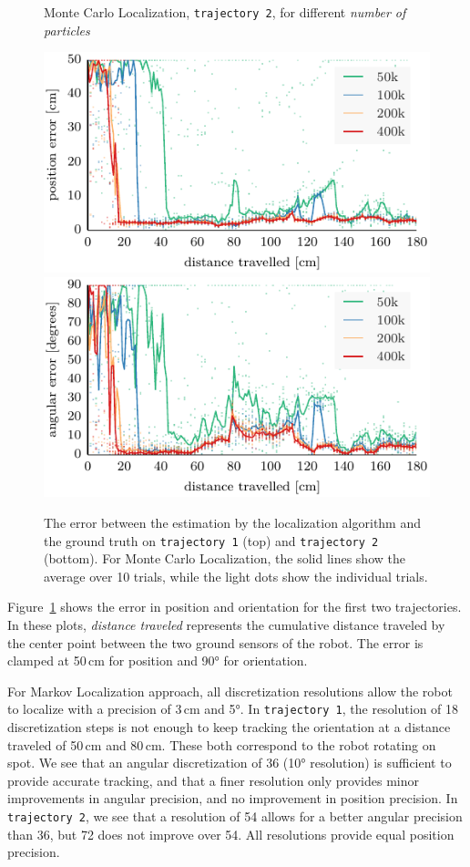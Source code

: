 \documentclass[letterpaper, 10pt, conference]{ieeeconf}
\newcommand{\Fig}[1]{Figure~\ref{fig:#1}}
\begin{document}
\begin{figure}
\begin{center}
Monte Carlo Localization, \texttt{trajectory~2}, for different \emph{number of particles}
\end{center}
\includegraphics{mcl-whole_random_2-xy}\hfill
\includegraphics{mcl-whole_random_2-theta}

\caption{The error between the estimation by the localization algorithm and the ground truth on \texttt{trajectory~1} (top) and \texttt{trajectory~2} (bottom).
For Monte Carlo Localization, the solid lines show the average over 10 trials, while the light dots show the individual trials.}
\label{fig:whole-runs-random12}
\end{figure}

\Fig{whole-runs-random12} shows the error in position and orientation for the first two trajectories.
In these plots, \emph{distance traveled} represents the cumulative distance traveled by the center point between the two ground sensors of the robot.
The error is clamped at 50\,cm for position and 90° for orientation.

For Markov Localization approach, all discretization resolutions allow the robot to localize with a precision of 3\,cm and 5°.
In \texttt{trajectory~1}, the resolution of 18 discretization steps is not enough to keep tracking the orientation at a distance traveled of 50\,cm and 80\,cm.
These both correspond to the robot rotating on spot.
We see that an angular discretization of 36 (10° resolution) is sufficient to provide accurate tracking, and that a finer resolution only provides minor improvements in angular precision, and no improvement in position precision.
In \texttt{trajectory~2}, we see that a resolution of 54 allows for a better angular precision than 36, but 72 does not improve over 54.
All resolutions provide equal position precision.
\end{document}
